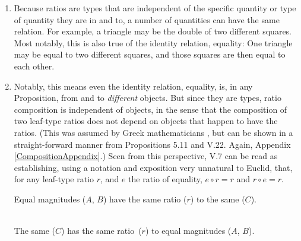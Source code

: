 \documentclass[11pt]{article}
\begin{document}
\begin{enumerate}
\item Because ratios are types that are independent of the specific quantity or type of quantity they are in and to, a number of quantities can have the same relation. For example, a triangle may be the double of two different squares. Most notably, this is also true of the identity relation, equality: One triangle may be equal to two different squares, and those squares are then equal to each other.

\item\label{equality} Notably, this means even the identity relation, equality, is, in any Proposition, from and to \textit{different} objects. But since they are types, ratio composition is independent of objects, in the sense that the composition of two leaf-type ratios does not depend on objects that happen to have the ratios. (This was assumed by Greek mathematicians \citep{acerbi2011}, but can be shown in a straight-forward manner from Propositions 5.11 and V.22. Again, Appendix \ref{CompositionAppendix}.) Seen from this perspective, V.7 can be read as establishing, using a notation and exposition very unnatural to Euclid, that, for any leaf-type ratio \(r\), and \(e\) the ratio of equality, \(e \circ r = r\) and \(r \circ e = r\). 

\centering%
\begin{tcolorbox}[%
	colbacktitle=white,
	coltitle = black,
	center title,
	halign upper=center,
	halign lower=center,
	fonttitle = \bfseries,
	colbacklower = white,
	colback = white,
	colframe=white,
	width = 0.95\linewidth,
	lower separated=false,
	sidebyside,
	boxrule=.2mm]
%

Equal magnitudes ($A$, $B$) have the same ratio ($r$) to the same ($C$).
\tcblower
\\
The same ($C$) has the same ratio~($r$) to equal magnitudes ($A$, $B$).
\end{tcolorbox}


\end{enumerate}
\end{document}
